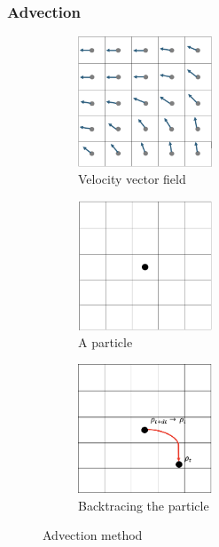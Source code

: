 \documentclass[a4paper,12pt]{article}
\begin{document}
\subsubsection{Advection}

\begin{figure}[H]
	\centering
	\begin{subfigure}{0.3\textwidth}
		\centering
		\includegraphics[width=4cm]{resources/advection1.png}
		\caption{Velocity vector field}
	\end{subfigure}%
	\begin{subfigure}{0.3\textwidth}
		\centering
		\includegraphics[width=4cm]{resources/advection2.png}
		\caption{A particle}
	\end{subfigure}
	\begin{subfigure}{0.3\textwidth}
		\centering
		\includegraphics[width=4cm]{resources/advection3.png}
		\caption{Backtracing the particle}
	\end{subfigure}
	\caption {Advection method}
	\label{fig:advection}
\end{figure}
\end{document}
